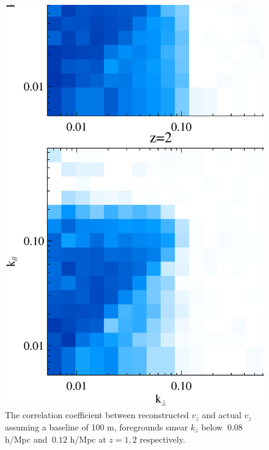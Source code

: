 \begin{figure}[btp]
\begin{minipage}[t]{0.33\linewidth}
{}
\label{fig:k3v}
\end{minipage}
\begin{minipage}[t]{0.33\linewidth}
\begin{center}
\includegraphics[width=\textwidth,height=1.7\textwidth]{figure/powv2d_z1z2_r15r10.eps}
\end{center}
\vspace{-0.7cm}
\caption{The correlation coefficient between reconstructed $v_z$  and actual $v_z$ 
assuming a baseline of 100 m, foregrounds 
    smear $k_z$ below $~0.08$ h/Mpc and $~0.12$ h/Mpc 
    at $z=1,2$ respectively. }

\end{minipage}
\end{figure}
